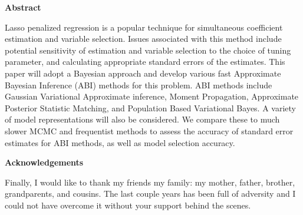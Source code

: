 \pagebreak
\hspace{0pt}

\begin{center}
    \textbf{\large Abstract }\\
    \vspace{0.5cm}
\end{center}
Lasso penalized regression is a popular technique for simultaneous coefficient estimation and variable selection. Issues associated with this method include potential sensitivity of estimation and variable selection to the choice of tuning parameter, and calculating appropriate standard errors of the estimates. This paper will adopt a Bayesian approach and develop various fast Approximate Bayesian Inference (ABI) methods for this problem. ABI methods include Gaussian Variational Approximate inference, Moment Propagation, Approximate Posterior Statistic Matching, and Population Based Variational Bayes. A variety of model representations will also be considered. We compare these to much slower MCMC and frequentist methods to assess the accuracy of standard error estimates for ABI methods, as well as model selection accuracy.


\newpage

\begin{center}
    \textbf{\large Acknowledgements}\\
    \vspace{0.5cm}
\end{center}
 
   Finally, I would like to thank my friends   my family: my mother, father, brother, grandparents, and cousins. The last couple years has been full of adversity and I could not have overcome it without your support behind the scenes.
   
\vfill
\hspace{0pt}
\pagebreak
\newpage